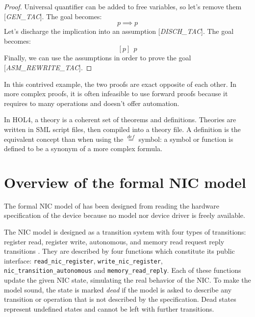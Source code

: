 \documentclass{kththesis}
\newcommand{\eqdef}{\stackrel{def}{=}}
\begin{document}
{{
\renewcommand*{\proofname}{Backward proof}
\begin{proof}
Universal quantifier can be added to free variables, so let's remove them [\textit{GEN\_TAC}]. The goal becomes:
$$p \implies p$$
Let's discharge the implication into an assumption [\textit{DISCH\_TAC}]. The goal becomes:
$$[p]~~p$$
Finally, we can use the assumptions in order to prove the goal [\textit{ASM\_REWRITE\_TAC}].
\end{proof}
}

In this contrived example, the two proofs are exact opposite of each other. In more complex proofs, it is often infeasible to use forward proofs because it requires to many operations and doesn't offer automation.

In HOL4, a theory is a coherent set of theorems and definitions. Theories are written in \gls{SML} script files, then compiled into a theory file. A definition is the equivalent concept than when using the $\eqdef$ symbol: a symbol or function is defined to be a synonym of a more complex formula.

\section{Overview of the formal NIC model} \label{overview-nic-model}


The formal NIC model of \cite{haglund_formal_2016} has been designed from reading the hardware specification of the device because no model nor device driver is freely available.

The NIC model is designed as a transition system with four types of transitions: register read, register write, autonomous, and memory read request reply transitions \footnotemark. They are described by four functions which constitute its public interface: \texttt{read\_nic\_register}, \texttt{write\_nic\_register}, \texttt{nic\_transition\_autonomous} and \texttt{memory\_read\_reply}. Each of these functions update the given NIC state, simulating the real behavior of the NIC. To make the model sound, the state is marked \textit{dead} if the model is asked to describe any transition or operation that is not described by the specification. Dead states represent undefined states and cannot be left with further transitions.


}
\end{document}

